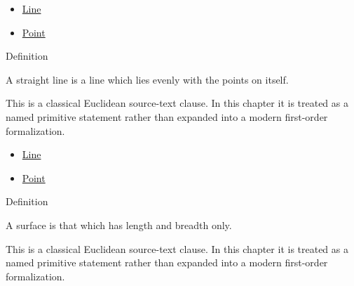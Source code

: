 \begin{lra-not-visible}
\begin{dependencies}
\begin{itemize}
  \item \hyperref[def:euclid-line]{Line}
  \item \hyperref[def:euclid-point]{Point}
\end{itemize}
\end{dependencies}
\end{lra-not-visible}

\begin{definitionbox}{Definition}
\begin{definition}
\label{def:euclid-straight-line}
A straight line is a line which lies evenly with the points on itself.
\end{definition}
\end{definitionbox}
\begin{remark*}
This is a classical Euclidean source-text clause. In this chapter it is treated
as a named primitive statement rather than expanded into a modern first-order
formalization.
\end{remark*}

\begin{lra-not-visible}
\begin{dependencies}
\begin{itemize}
  \item \hyperref[def:euclid-line]{Line}
  \item \hyperref[def:euclid-point]{Point}
\end{itemize}
\end{dependencies}
\end{lra-not-visible}

\begin{definitionbox}{Definition}
\begin{definition}[Surface]
\label{def:euclid-surface}
A surface is that which has length and breadth only.
\end{definition}
\end{definitionbox}
\begin{remark*}
This is a classical Euclidean source-text clause. In this chapter it is treated
as a named primitive statement rather than expanded into a modern first-order
formalization.
\end{remark*}

\begin{lra-not-visible}
\NoLocalDependencies
\end{lra-not-visible}


